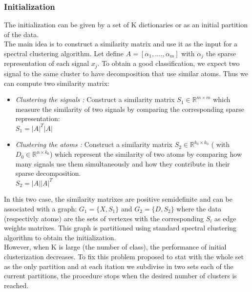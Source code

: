 \documentclass[a4paper,10pt]{article}
\newcommand{\R}{\mathbb{R}}
\begin{document}
\subsubsection{Initialization}
The initialization can be given by a set of K dictionaries or as an initial partition of the data.\\
The main idea is to construct a similarity matrix and use it as the input for  a spectral clustering algorithm. Let define $A = [\alpha_1,....,  \alpha_m]$ with $\alpha_j$ the sparse representation of each signal $x_j$. To obtain a good classification, we expect two signal to the same cluster to have decomposition that use similar atoms. Thus we can compute two similarity matrix:
\begin{itemize}
 \item \textit{Clustering the signals :} Construct a similarity matrix $S_1 \in \R^{m \times m}$ which measure the similarity of two signals by comparing the corresponding sparse representation:\\
 $S_1 = |A|^T |A|$
 \item \textit{Clustering the atoms :} Construct a similarity matrix $S_2 \in \R^{k_0 \times k_0}$ ( with $D_0 \in \R^{n \times k_0}$) which represent the similarity of two atoms by comparing how many signals use them simultaneously and how they contribute in their sparse decomposition.\\
 $S_2 = |A||A|^T$
\end{itemize}
In this two case, the similarity matrixes are positive semidefinite and can be associated with a graph: $G_1 = \{X,S_1\}$ and $G_2 = \{D,S_2\}$ where the data (respectivly atoms) are the sets of vertexes with the corresponding $S_i$ as edge weights matrixes. This graph is partitioned using standard spectral clustering algorithm to obtain the initialization.\\
However, when K is large (the number of class), the performance of initial clusterization decreases. To fix this problem \cite{5494985} proposed to stat with the whole set as the only partition and at each itation we subdivise in two sets each of the current partitions, the procedure stops when the desired number of clusters is reached.

\newpage
\end{document}
